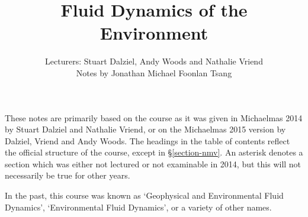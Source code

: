 \documentclass{book}
\title{Fluid Dynamics of the Environment}
\author{
    Lecturers: Stuart Dalziel, Andy Woods and Nathalie Vriend \\ 
Notes by Jonathan Michael Foonlan Tsang}
\numberwithin{equation}{section}
\begin{document}
\maketitle

These notes are primarily based on the course as it was given in Michaelmas 2014
by Stuart Dalziel and Nathalie Vriend, or on the Michaelmas 2015 version by
Dalziel, Vriend and Andy Woods. The headings in the table of contents reflect
the official structure of the course, except in \S\ref{section-nmv}. An asterisk
denotes a section which was either not lectured or not examinable in 2014, but
this will not necessarily be true for other years.

In the past, this course was known as `Geophysical and Environmental Fluid
Dynamics', `Environmental Fluid Dynamics', or a variety of other names.

\tableofcontents















\end{document}
